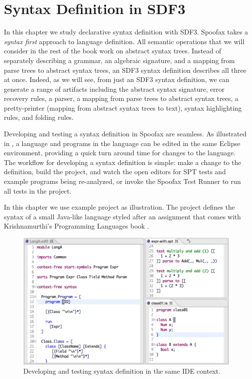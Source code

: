 \chapter{Syntax Definition in SDF3}

In this chapter we study declarative syntax definition with SDF3.
Spoofax takes a \emph{syntax first} approach to language definition.
All semantic operations that we will consider in the rest of the book work on
abstract syntax trees.
Instead of separately describing a grammar, an algebraic signature, and a
mapping from parse trees to abstract syntax trees, an SDF3 syntax definition
describes all three at once. 
Indeed, as we will see, from just an SDF3 syntax definition, we can generate a
range of artifacts including the abstract syntax signature, error recovery
rules, a parser, a mapping from parse trees to abstract syntax trees, a
pretty-printer (mapping from abstract syntax trees to text), syntax
highlighting rules, and folding rules.

Developing and testing a syntax definition in Spoofax are seamless. As
illustrated in , a language and programs in the language can
be edited in the same Eclipse environment, providing a quick turn around time
for changes to the language. The workflow for developing a syntax definition is
simple: make a change to the definition, build the project, and watch the
open editors for SPT tests and example programs being re-analyzed, or invoke
the Spoofax Test Runner to run all tests in the project.

In this chapter we use example project  as
illustration. The project defines the syntax of a small Java-like language
styled after an assignment that comes with
Krishnamurthi's Programming Languages book \cite{Krishnamurthi2014}.

\begin{figure}[t]
\includegraphics[width=\hsize]{syntax/syntax-dev.pdf}
\caption{Developing and testing syntax definition in the same IDE context.}
\end{figure}


